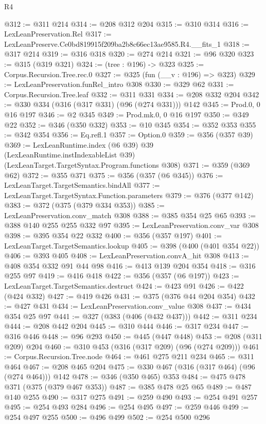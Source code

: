 \begin{lexlean}{R4}
\begin{coremodule}
@312 := @311 @214
@314 := @208 @312 @204
@315 := @310 @314
@316 := LexLeanPreservation.Rel
@317 := LexLeanPreserve.Ce0bd819915f209ba2b8c66ec13ae9585.R4.__fits_1
@318 := @317 @214
@319 := @316 @318
@320 := @274 @214
@321 := @96 @320
@323 := @315 (@319 @321)
@324 := (tree : @196) -> @323
@325 := Corpus.Recursion.Tree.rec.{0}
@327 := @325 (fun (__v : @196) => @323)
@329 := LexLeanPreservation.funRel_intro @308
@330 := @329 @62
@331 := Corpus.Recursion.Tree.leaf
@332 := @311 @331
@334 := @208 @332 @204
@342 := @330 @334 (@316 (@317 @331) (@96 (@274 @331))) @142
@345 := Prod.{0, 0} @16 @197
@346 := @2 @345
@349 := Prod.mk.{0, 0} @16 @197
@350 := @349 @22
@352 := @346 (@350 @332)
@353 := @10 @345
@354 := @352 @353
@355 := @342 @354
@356 := Eq.refl.{1}
@357 := Option.{0}
@359 := @356 (@357 @39)
@369 := LexLeanRuntime.index
    (@6 @39)
    @39
    (LexLeanRuntime.instIndexableList @39)
    (LexLeanTarget.TargetSyntax.Program.functions @308)
@371 := @359 (@369 @62)
@372 := @355 @371
@375 := @356 (@357 (@6 @345))
@376 := LexLeanTarget.TargetSemantics.bindAll
@377 := LexLeanTarget.TargetSyntax.Function.parameters
@379 := @376 (@377 @142)
@383 := @372 (@375 (@379 @334 @353))
@385 := LexLeanPreservation.conv_match @308
@388 := @385 @354 @25 @65
@393 := @388 @140 @255 @255 @332 @97
@395 := LexLeanPreservation.conv_var @308
@398 := @395 @354 @22 @332
@400 := @356 (@357 @197)
@401 := LexLeanTarget.TargetSemantics.lookup
@405 := @398 (@400 (@401 @354 @22))
@406 := @393 @405
@408 := LexLeanPreservation.convA_hit @308
@413 := @408 @354 @332 @91 @44 @98
@416 := @413 @139 @204 @354
@418 := @316 @255 @97
@419 := @416 @418
@422 := @356 (@357 (@6 @197))
@423 := LexLeanTarget.TargetSemantics.destruct
@424 := @423 @91
@426 := @422 (@424 @332)
@427 := @419 @426
@431 := @375 (@376 @44 @204 @354)
@432 := @427 @431
@434 := LexLeanPreservation.conv_value @308
@437 := @434 @354 @25 @97
@441 := @327 (@383 (@406 (@432 @437)))
@442 := @311 @234
@444 := @208 @442 @204
@445 := @310 @444
@446 := @317 @234
@447 := @316 @446
@448 := @96 @293
@450 := @445 (@447 @448)
@453 := @208 (@311 @209) @204
@460 := @310 @453 (@316 (@317 @209) (@96 (@274 @209)))
@461 := Corpus.Recursion.Tree.node
@464 := @461 @275 @211 @234
@465 := @311 @464
@467 := @208 @465 @204
@475 := @330 @467 (@316 (@317 @464) (@96 (@274 @464))) @142
@478 := @346 (@350 @465) @353
@484 := @475 @478 @371 (@375 (@379 @467 @353))
@487 := @385 @478 @25 @65
@489 := @487 @140 @255
@490 := @317 @275
@491 := @259 @490
@493 := @254 @491 @257
@495 := @254 @493 @284
@496 := @254 @495
@497 := @259 @446
@499 := @254 @497 @255
@500 := @496 @499
@502 := @254 @500 @296

\end{coremodule}
\end{lexlean}
